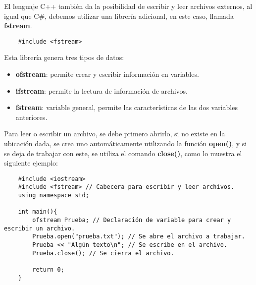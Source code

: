 El lenguaje C++ también da la posibilidad de escribir y leer archivos externos, al igual que C\#, debemos utilizar una librería adicional, en este caso, llamada \textbf{fstream}.
\begin{lstlisting}
    #include <fstream>
\end{lstlisting}

Esta librería genera tres tipos de datos:
\begin{itemize}
    \item \textbf{ofstream}: permite crear y escribir información en variables.
    \item \textbf{ifstream}: permite la lectura de información de archivos.
    \item \textbf{fstream}: variable general, permite las características de las dos variables anteriores.
\end{itemize}

Para leer o escribir un archivo, se debe primero abrirlo, si no existe en la ubicación dada, se crea uno automáticamente utilizando la función \textbf{open()}, y si se deja de trabajar con este, se utiliza el comando \textbf{close()}, como lo muestra el siguiente ejemplo:
\begin{lstlisting}
    #include <iostream>
    #include <fstream> // Cabecera para escribir y leer archivos.
    using namespace std;
    
    int main(){
        ofstream Prueba; // Declaración de variable para crear y escribir un archivo.
        Prueba.open("prueba.txt"); // Se abre el archivo a trabajar.
        Prueba << "Algún texto\n"; // Se escribe en el archivo.
        Prueba.close(); // Se cierra el archivo.
        
        return 0;
    }
\end{lstlisting}

